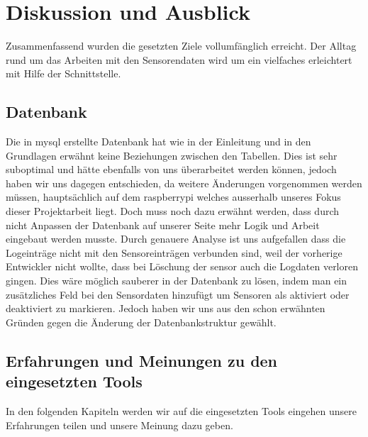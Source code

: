 \documentclass[../main.tex]{subfiles}
\begin{document}
	\section{Diskussion und Ausblick}
	Zusammenfassend wurden die gesetzten Ziele vollumfänglich erreicht. Der Alltag rund um das Arbeiten mit den Sensorendaten wird um ein vielfaches erleichtert mit Hilfe der Schnittstelle. \\
	\par
	\noindent

	\subsection{Datenbank}
	Die in \gls{mysql} erstellte Datenbank hat wie in der Einleitung und in den Grundlagen erwähnt keine Beziehungen zwischen den Tabellen. Dies ist sehr suboptimal und hätte ebenfalls von uns überarbeitet werden können, jedoch haben wir uns dagegen entschieden, da weitere Änderungen vorgenommen werden müssen, hauptsächlich auf dem \gls{raspberrypi} welches ausserhalb unseres Fokus dieser Projektarbeit liegt. Doch muss noch dazu erwähnt werden, dass durch nicht Anpassen der Datenbank auf unserer Seite mehr Logik und Arbeit eingebaut werden musste. Durch genauere Analyse ist uns aufgefallen dass die Logeinträge nicht mit den Sensoreinträgen verbunden sind, weil der vorherige Entwickler nicht wollte, dass bei Löschung der \gls{sensor} auch die Logdaten verloren gingen. Dies wäre möglich sauberer in der Datenbank zu lösen, indem man ein zusätzliches Feld bei den Sensordaten hinzufügt um Sensoren als aktiviert oder deaktiviert zu markieren. Jedoch haben wir uns aus den schon erwähnten Gründen gegen die Änderung der Datenbankstruktur gewählt.
	
	\subsection{Erfahrungen und Meinungen zu den eingesetzten Tools}
	In den folgenden Kapiteln werden wir auf die eingesetzten Tools eingehen unsere Erfahrungen teilen und unsere Meinung dazu geben.
	
\end{document}
